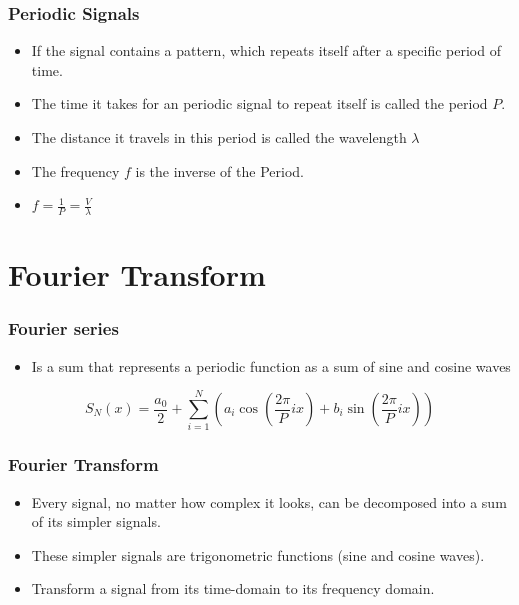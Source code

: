 \documentclass{beamer}
\begin{document}
	\begin{frame}
		\frametitle{Periodic Signals}
		
		\begin{itemize}
			\item
			If the signal contains a pattern, which repeats itself after a specific period of time.
			
			\item
			The time it takes for an periodic signal to repeat itself is called the period $P$.
			
			\item
			The distance it travels in this period is called the wavelength $\lambda$
			
			\item
			The frequency $f$ is the inverse of the Period.
			
			\item
			$f = \frac{1}{P} = \frac{V}{\lambda}$
			
			
		\end{itemize}
		
		
	\end{frame}

	\section{Fourier Transform}
	\begin{frame}
		\frametitle{Fourier series}
		
		\begin{itemize}
			\item
			Is a sum that represents a periodic function as a sum of sine and cosine waves
			
		\end{itemize}
	
		\[
		S_N(x) = \frac{a_0}{2} + \sum\limits_{i=1}^{N}\left(a_i\cos\left(\frac{2\pi}{P}i x\right) + b_i \sin\left(\frac{2\pi}{P}i x\right)\right)
		\]
			
	\end{frame}

	\begin{frame}
		\frametitle{Fourier Transform}
		
		\begin{itemize}
			\item
			
			Every signal, no matter how complex it looks, can be decomposed into a sum of its simpler signals.
			
			\item
			These simpler signals are trigonometric functions (sine and cosine waves).
			
			\item
			
			Transform a signal from its time-domain to its frequency domain.
			
		\end{itemize}
		
	\end{frame}
\end{document}
